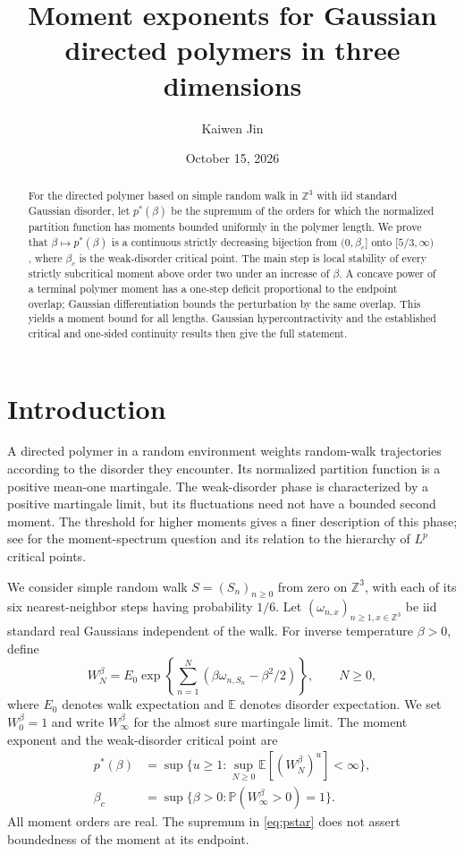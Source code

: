 \documentclass[11pt]{amsart}
\title{Moment exponents for Gaussian directed polymers in three dimensions}
\author{Kaiwen Jin}
\date{October 15, 2026}
\newcommand{\E}{\mathbb E}
\newcommand{\Pp}{\mathbb P}
\newcommand{\Z}{\mathbb Z}
\newcommand{\ps}{p^*}
\theoremstyle{remark}
\numberwithin{equation}{section}
\begin{document}
\begin{abstract}
For the directed polymer based on simple random walk in $\Z^3$ with iid
standard Gaussian disorder, let $p^*(\beta)$ be the supremum of the orders for
which the normalized partition function has moments bounded uniformly in the
polymer length. We prove that $\beta\mapsto p^*(\beta)$ is a continuous strictly
decreasing bijection from $(0,\beta_c]$ onto $[5/3,\infty)$, where $\beta_c$
is the weak-disorder critical point. The main step is local stability of every
strictly subcritical moment above order two under an increase of $\beta$.
A concave power of a terminal polymer moment has a one-step deficit proportional
to the endpoint overlap; Gaussian differentiation bounds the perturbation by
the same overlap. This yields a moment bound for all lengths. Gaussian
hypercontractivity and the established critical and one-sided continuity
results then give the full statement.
\end{abstract}
\maketitle

\section{Introduction}
A directed polymer in a random environment weights random-walk trajectories
according to the disorder they encounter. Its normalized partition function
is a positive mean-one martingale. The weak-disorder phase is characterized by
a positive martingale limit, but its fluctuations need not have a bounded
second moment. The threshold for higher moments gives a finer description of
this phase; see \cite[Section~3.3.2]{Berger} for the moment-spectrum question
and its relation to the hierarchy of $L^p$ critical points.

We consider simple random walk $S=(S_n)_{n\ge0}$ from zero on $\Z^3$, with
each of its six nearest-neighbor steps having probability $1/6$. Let
$(\omega_{n,x})_{n\ge1,x\in\Z^3}$ be iid standard real Gaussians independent
of the walk. For inverse temperature $\beta>0$, define
\begin{equation}\label{eq:partition}
 W_N^\beta=E_0\exp\!\left\{\sum_{n=1}^N
 (\beta\omega_{n,S_n}-\beta^2/2)\right\},\qquad N\ge0,
\end{equation}
where $E_0$ denotes walk expectation and $\E$ denotes disorder expectation.
We set $W_0^\beta=1$ and write $W_\infty^\beta$ for the almost sure martingale
limit. The moment exponent and the weak-disorder critical point are
\begin{align}
 \ps(\beta)&=\sup\{u\ge1:\sup_{N\ge0}\E[(W_N^\beta)^u]<\infty\},
 \label{eq:pstar}\\
 \beta_c&=\sup\{\beta>0:\Pp(W_\infty^\beta>0)=1\}.
 \label{eq:betac}
\end{align}
All moment orders are real. The supremum in \eqref{eq:pstar} does not assert
boundedness of the moment at its endpoint.
\end{document}
